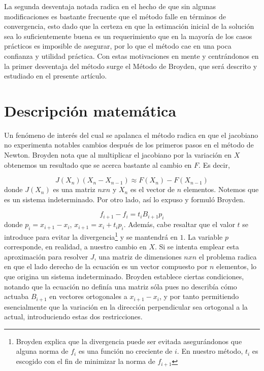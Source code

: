 \documentclass[12pt]{article}
\begin{document}
La segunda desventaja notada radica en el hecho de que sin algunas modificaciones es bastante frecuente que el método falle en términos de convergencia, esto dado que la certeza en que la estimación inicial de la solución sea lo suficientemente buena es un requerimiento que en la mayoría de los casos prácticos es imposible de asegurar, por lo que el método cae en una poca confianza y utilidad práctica. Con estas motivaciones en mente y centrándonos en la primer desventaja del método surge el Método de Broyden, que será descrito y estudiado en el presente artículo.

\section{Descripción matemática}

Un fenómeno de interés del cual se apalanca el método radica en que el jacobiano no experimenta notables cambios después de los primeros pasos en el método de Newton. Broyden nota que al multiplicar el jacobiano por la variación en $X$ obtenemos un resultado que se acerca bastante al cambio en $F$. Es decir,

\begin{equation*}
    J(X_n)(X_n - X_{n-1}) \approx F(X_n) - F(X_{n-1})
\end{equation*}
donde $J(X_n)$ es una matriz $nxn$ y $X_n$ es el vector de $n$ elementos. Notemos que es un sistema indeterminado. Por otro lado, así lo expuso y formuló Broyden.

\begin{equation*}
    f_{i+1} - f_i = t_i B_{i+1} p_i
\end{equation*}
donde $p_i = x_{i+1} - x_i$, $x_{i+1} = x_i + t_i p_i$. Además, cabe resaltar que el valor $t$ se introduce para evitar la divergencia\footnote{Broyden explica que la divergencia puede ser evitada asegurándonos que alguna norma de $f_i$ es una función no creciente de $i$. En nuestro método, $t_i$ es escogido con el fin de minimizar la norma de $f_{i+1}$} y se mantendrá en $1$. La variable $p$ corresponde, en realidad, a nuestro cambio en $X$. Si se intenta emplear esta aproximación para resolver $J$, una matriz de dimensiones $nxn$ el problema radica en que el lado derecho de la ecuación es un vector compuesto por $n$ elementos, lo que origina un sistema indeterminado. Broyden establece ciertas condiciones, notando que la ecuación no definía una matriz sóla pues no describía cómo actuaba $B_{i+1}$ en vectores ortogonales a $x_{i+1} - x_i$, y por tanto permitiendo esencialmente que la variación en la dirección perpendicular sea ortogonal a la actual, introduciendo estas dos restricciones.
\end{document}

